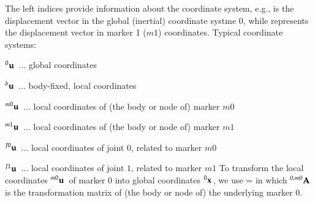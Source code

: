 %
\noindent The left indices provide information about the coordinate system, e.g.,
\be
\ee
is the displacement vector in the global (inertial) coordinate systme $0$, while 
\be
\ee
represents the displacement vector in marker 1 ($m1$) coordinates. Typical coordinate systems:
\bi
  \item $\prescript{0}{}{\mathbf{u}}\,$ $\ldots$ global coordinates
  \item $\prescript{b}{}{\mathbf{u}}\,$ $\ldots$ body-fixed, local coordinates
  \item $\prescript{m0}{}{\mathbf{u}}\,$ $\ldots$ local coordinates of (the body or node of) marker $m0$
  \item $\prescript{m1}{}{\mathbf{u}}\,$ $\ldots$ local coordinates of (the body or node of) marker $m1$
  \item $\prescript{J0}{}{\mathbf{u}}\,$ $\ldots$ local coordinates of joint $0$, related to marker $m0$
  \item $\prescript{J1}{}{\mathbf{u}}\,$ $\ldots$ local coordinates of joint $1$, related to marker $m1$
\ei
To transform the local coordinates $\prescript{m0}{}{\mathbf{u}}\,$ of marker 0 into global coordinates $\prescript{0}{}{\mathbf{x}}\,$, we use
\be
   =  
\ee
in which $\prescript{0,m0}{}{\mathbf{A}}\,$ is the transformation matrix of (the body or node of) the underlying marker 0.

